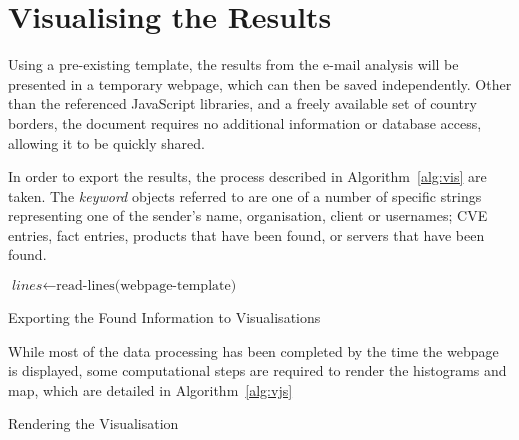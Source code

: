 \section{Visualising the Results}

Using a pre-existing template, the results from the e-mail analysis will be
presented in a temporary webpage, which can then be saved independently.  Other
than the referenced JavaScript libraries, and a freely available set of country 
borders, the document requires no additional information or database access, 
allowing it to be quickly shared.

In order to export the results, the process described in
Algorithm~\ref{alg:vis} are taken.  The \textit{keyword} objects referred to are
one of a number of specific strings representing one of the sender's name,
organisation, client or usernames; CVE entries, fact entries, products that
have been found, or servers that have been found.

\begin{algorithm}
	$\textit{lines}\gets\text{read-lines(webpage-template)}$\;
	\;
	\caption{Exporting the Found Information to Visualisations}
	\label{alg:vis}
\end{algorithm}

While most of the data processing has been completed by the time the webpage is 
displayed, some computational steps are required to render the histograms and
map, which are detailed in Algorithm~\ref{alg:vjs}

\begin{algorithm}

	\;
	\caption{Rendering the Visualisation}
	\label{alg:vjs}
\end{algorithm}
